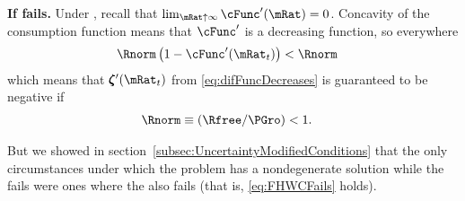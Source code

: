 \documentclass[\econtexRoot/BufferStockTheory]{subfiles}
\begin{document}
\textbf{If {\RIC} fails.}
Under \cncl{\RIC}, recall that $\lim_{\mRat \uparrow \infty} \cFunc^{\prime}(\mRat) = 0$.  Concavity of the consumption function means that $\cFunc^{\prime}$ is a decreasing function, so everywhere 
\begin{align*}
  \Rnorm\left(1-\cFunc^{\prime}({\mRat}_t)\right) & < \Rnorm
\end{align*}
which means that $\difFunc^{\prime}(\mRat_{t})$ from \eqref{eq:difFuncDecreases} is guaranteed to be negative if
\begin{equation}\begin{gathered}\begin{aligned}
  \Rnorm \equiv (\Rfree/\PGro) & < 1  \label{eq:FHWCFails}.
\end{aligned}\end{gathered}\end{equation}

But we showed in section~\ref{subsec:UncertaintyModifiedConditions} that the only circumstances under which the problem has a nondegenerate solution while the {\RIC} fails were ones where the {\FHWC} also fails (that is, \eqref{eq:FHWCFails} holds).

\begin{comment}
\subsection{Comment}
\subsection{Proof of Lemma}



Due to the model's nonlinearities the values of $\mRat$ at which the expected growth rate of $\cLevBF$ matches $\PGro$ is very slightly different from the $\mRat$ at which the growth rate at which expected growth of $\mLevBF$ is $\PGro$.  Defining $\grave{\mRat}$ as the $\mRat$ at which $\Ex_{t}[\cRatBF_{t+1}/\cRatBF_{t}]=\PGro$, we can show that to first order $\grave{\mRat} \approx \check{\mRat}.$
\begin{align*}
  \Ex_{t}[\cFunc(\mRat_{t+1})\pShk_{t+1}] & = \cFunc(\mRat_{t}) \label{eq:balgrostableC}.
  \\ \Ex_{t}[\left(\cFunc(\grave{\mRat})+\cFunc^{\prime}(\grave{\mRat})(\mRat_{t+1}-\grave{\mRat})\right)\pShk_{t+1}] & \approx \cFunc(\grave{\mRat})
  \\ \Ex_{t}[\left(\cFunc^{\prime}(\grave{\mRat})(\mRat_{t+1}-\grave{\mRat})\right)\pShk_{t+1}] & \approx 0
  \\ \Ex_{t}[\mRat_{t+1}] & \approx \grave{\mRat} 
\end{align*}
but at $\mRat=\check{\mRat}$, $\Ex_{t}[\mRat_{t+1}]=\check{\mRat}\approx\grave{\mRat}$.
\end{comment}
\end{document}
